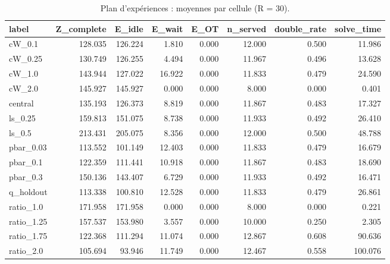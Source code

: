 \begin{table}[htbp]
\caption{Plan d'expériences : moyennes par cellule (R = 30).}
\label{tab:doe}
\begin{tabular}{lrrrrrrr}
\toprule
label & Z\_complete & E\_idle & E\_wait & E\_OT & n\_served & double\_rate & solve\_time \\
\midrule
cW\_0.1 & 128.035 & 126.224 & 1.810 & 0.000 & 12.000 & 0.500 & 11.986 \\
cW\_0.25 & 130.749 & 126.255 & 4.494 & 0.000 & 11.967 & 0.496 & 13.628 \\
cW\_1.0 & 143.944 & 127.022 & 16.922 & 0.000 & 11.833 & 0.479 & 24.590 \\
cW\_2.0 & 145.927 & 145.927 & 0.000 & 0.000 & 8.000 & 0.000 & 0.401 \\
central & 135.193 & 126.373 & 8.819 & 0.000 & 11.867 & 0.483 & 17.327 \\
ls\_0.25 & 159.813 & 151.075 & 8.738 & 0.000 & 11.933 & 0.492 & 26.410 \\
ls\_0.5 & 213.431 & 205.075 & 8.356 & 0.000 & 12.000 & 0.500 & 48.788 \\
pbar\_0.03 & 113.552 & 101.149 & 12.403 & 0.000 & 11.833 & 0.479 & 16.679 \\
pbar\_0.1 & 122.359 & 111.441 & 10.918 & 0.000 & 11.867 & 0.483 & 18.690 \\
pbar\_0.3 & 150.136 & 143.407 & 6.729 & 0.000 & 11.933 & 0.492 & 16.471 \\
q\_holdout & 113.338 & 100.810 & 12.528 & 0.000 & 11.833 & 0.479 & 26.861 \\
ratio\_1.0 & 171.958 & 171.958 & 0.000 & 0.000 & 8.000 & 0.000 & 0.221 \\
ratio\_1.25 & 157.537 & 153.980 & 3.557 & 0.000 & 10.000 & 0.250 & 2.305 \\
ratio\_1.75 & 122.368 & 111.294 & 11.074 & 0.000 & 12.867 & 0.608 & 90.636 \\
ratio\_2.0 & 105.694 & 93.946 & 11.749 & 0.000 & 12.467 & 0.558 & 100.076 \\
\bottomrule
\end{tabular}
\end{table}

